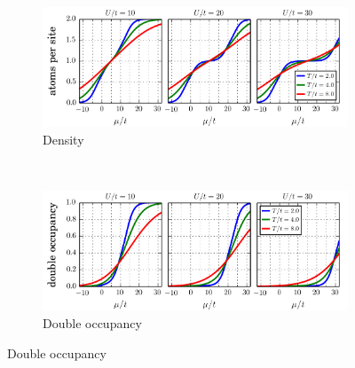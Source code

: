 \begin{figure}
        \centering
        \begin{subfigure}[b]{0.48\textwidth}
                \includegraphics[width=\textwidth]{../figures/lda_evap/HTSE_density_U.png}
                \caption{Density}
\label{fig:HTSEhomogeneousA}
        \end{subfigure}%
        ~
        \begin{subfigure}[b]{0.48\textwidth}
                \includegraphics[width=\textwidth]{../figures/lda_evap/HTSE_doublons_U.png}
                \caption{Double occupancy}
\label{fig:HTSEhomogeneousB}
        \end{subfigure}


\end{figure}

